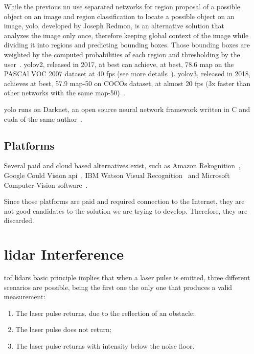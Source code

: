 While the previous \ac{nn} use separated networks for region proposal of a possible object on an image and region classification to locate a possible object on an image, \ac{yolo}, developed by Joseph Redmon, is an alternative solution that analyzes the image only once, therefore keeping global context of the image while dividing it into regions and predicting bounding boxes. Those bounding boxes are weighted by the computed probabilities of each region and thresholding by the user~\cite{Redmon2016}. \ac{yolo}v2, released in 2017, at best can achieve, at best, 78.6 \ac{map} on the PASCAl VOC 2007 dataset at 40 \ac{fps} (see more details~\cite{Redmon2017}). \ac{yolo}v3, released in 2018, achieves at best, 57.9 \ac{map}-50 on COCOs dataset, at almost 20 \ac{fps} (3x faster than other networks with the same \ac{map}-50)~\cite{Redmon2018}.

\ac{yolo} runs on Darknet, an open source neural network framework written in C and \ac{cuda} of the same author~\cite{Redmon2013}.


\subsection{Platforms}
Several paid and cloud based alternatives exist, such as Amazon Rekognition~\cite{awsRekognition}, Google Could Vision \ac{api}~\cite{googlevision}, IBM Watson Visual Recognition~\cite{watson} and Microsoft Computer Vision software~\cite{azurecv}. 

Since those platforms are paid and required connection to the Internet, they are not good candidates to the solution we are trying to develop. Therefore, they are discarded.


\section{\ac{lidar} Interference}
\ac{tof} \ac{lidar}s basic principle implies that when a \ac{laser} pulse is emitted, three different scenarios are possible, being the first one the only one that produces a valid measurement:

\begin{enumerate}
\item The \ac{laser} pulse returns, due to the reflection of an obstacle;
\item The \ac{laser} pulse does not return;
\item The \ac{laser} pulse returns with intensity below the noise floor.
\end{enumerate}


